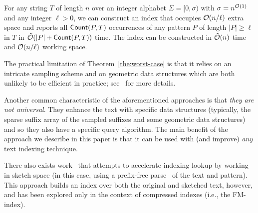 
\begin{theorem}\label{the:worst-case}
For any string $T$ of length $n$ over an integer alphabet $\Sigma=[0,\sigma)$ with $\sigma=n^{\mathcal{O}(1)}$ and any integer $\ell>0$, we can construct an index that occupies $\mathcal{O}(n/\ell)$ extra space and reports all $\textup{\textsf{Count}}(P,T)$ occurrences of any pattern $P$ of length $|P|\geq \ell$ in $T$ in $\mathcal{\tilde{O}}(|P|+\textup{\textsf{Count}}(P,T))$ time. The index can be constructed in $\mathcal{\tilde{O}}(n)$ time and $\mathcal{O}(n/\ell)$ working space.
\end{theorem}

The practical limitation of Theorem~\ref{the:worst-case} is that it relies on
an intricate sampling scheme and on geometric data structures
which are both unlikely to be efficient in practice; see~\cite{DBLP:journals/corr/abs-2407-11819} for more details.


Another common characteristic of the aforementioned approaches %
is that \emph{they are not universal}. They enhance the text with specific data structures (typically, the sparse suffix array of the sampled suffixes and some geometric data structures) and so they also have a specific query algorithm. The main benefit of the approach we describe in this paper is that it can be used with (and improve) 
\emph{any} text indexing technique.

 There also exists work~\cite{accelerated_fm_pfp} that attempts to accelerate indexing lookup by working in sketch space (in this case, using a prefix-free parse~\cite{Boucher_2019} of the text and pattern). This approach builds an index over both the original and sketched text, however, and has been explored only in the context of compressed indexes (i.e., the FM-index).

